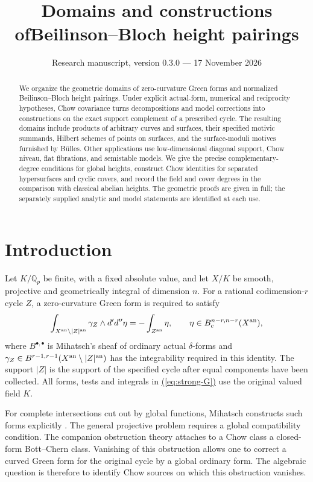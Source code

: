 \documentclass[11pt,a4paper]{article}
\title{Domains and constructions of\newline Beilinson--Bloch height pairings}
\author{}
\date{Research manuscript, version 0.3.0 --- 17 November 2026}
\theoremstyle{definition}
\theoremstyle{remark}\newtheorem{remark}[theorem]{Remark}
\numberwithin{equation}{section}
\newcommand{\Q}{\mathbb Q}\newcommand{\R}{\mathbb R}\newcommand{\C}{\mathbb C}
\newcommand{\D}{d'd''}\newcommand{\ob}{\mathfrak o}
\renewcommand{\eqref}[1]{\hyperref[#1]{\textcolor{equationlink}{(\ref*{#1})}}}
\begin{document}
\maketitle
\begin{abstract}
We organize the geometric domains of zero-curvature Green forms and normalized
Beilinson--Bloch height pairings. Under explicit actual-form, numerical
and reciprocity hypotheses, Chow covariance turns decompositions and model
corrections into constructions on the exact support complement of a prescribed
cycle. The resulting domains include products of arbitrary curves and
surfaces, their specified motivic summands, Hilbert schemes of points on
surfaces, and the surface-moduli motives furnished by B\"ulles. Other
applications use low-dimensional diagonal support, Chow niveau, flat
fibrations, and semistable models. We give the precise complementary-degree
conditions for global heights, construct Chow identities for separated
hypersurfaces and cyclic covers, and record the field and cover degrees in
the comparison with classical abelian heights. The geometric proofs are given
in full; the separately supplied analytic and model statements are identified
at each use.
\end{abstract}
\tableofcontents

\section{Introduction}\label{sec:intro}

Let $K/\Q_p$ be finite, with a fixed absolute value, and let $X/K$ be smooth,
projective and geometrically integral of dimension $n$. For a rational
codimension-$r$ cycle $Z$, a zero-curvature Green form is required to satisfy
\begin{equation}\label{eq:strong-G}
 \int_{X^{\an}\setminus |Z|^{\an}}\gamma_Z\wedge\D\eta
       =-\int_{Z^{\an}}\eta,
 \qquad \eta\in B_c^{n-r,n-r}(X^{\an}),
\end{equation}
where $B^{\bullet,\bullet}$ is Mihatsch's sheaf of ordinary actual
$\delta$-forms and
$\gamma_Z\in B^{r-1,r-1}(X^{\mathrm{an}}\setminus |Z|^{\mathrm{an}})$ has the
integrability required in this identity. The support $|Z|$ is the support of
the specified cycle after equal components have been collected. All forms,
tests and integrals in \eqref{eq:strong-G} use the original valued field $K$.

For complete intersections cut out by global functions, Mihatsch constructs
such forms explicitly \cite[Theorem 5.5]{Mihatsch}. The general projective
problem requires a global compatibility condition. The companion obstruction
theory \cite{InternalGreen,InternalNumerical,InternalCovariance} attaches to a
Chow class a closed-form Bott--Chern class. Vanishing of this obstruction
allows one to correct a curved Green form for the original cycle by a global
ordinary form. The algebraic question is therefore to identify Chow sources
on which this obstruction vanishes.
\end{document}

